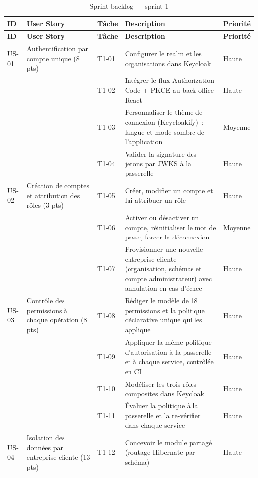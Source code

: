 \begin{small}
\begin{longtable}{L{1.1cm}L{3.0cm}L{1.2cm}L{7.0cm}L{1.4cm}}
\caption{Sprint backlog — sprint 1}\label{tab:backlog-s1}\\
\hline
{}
\textbf{ID} & \textbf{User Story} & \textbf{Tâche} & \textbf{Description} & \textbf{Priorité} \\
\hline
\endfirsthead
\hline
{}
\textbf{ID} & \textbf{User Story} & \textbf{Tâche} & \textbf{Description} & \textbf{Priorité} \\
\hline
\endhead
\hline
\endfoot

US-01 & Authentification par compte unique (8 pts) & T1-01 & Configurer le realm  et les organisations dans Keycloak & Haute \\
\hline
      &  & T1-02 & Intégrer le flux Authorization Code + PKCE au back-office React & Haute \\
\hline
      &  & T1-03 & Personnaliser le thème de connexion (Keycloakify)~: langue et mode sombre de l'application & Moyenne \\
\hline
      &  & T1-04 & Valider la signature des jetons par JWKS à la passerelle & Haute \\
\hline
US-02 & Création de comptes et attribution des rôles (3 pts) & T1-05 & Créer, modifier un compte et lui attribuer un rôle & Haute \\
\hline
      &  & T1-06 & Activer ou désactiver un compte, réinitialiser le mot de passe, forcer la déconnexion & Moyenne \\
\hline
      &  & T1-07 & Provisionner une nouvelle entreprise cliente (organisation, schémas et compte administrateur) avec annulation en cas d'échec & Haute \\
\hline
US-03 & Contrôle des permissions à chaque opération (8 pts) & T1-08 & Rédiger le modèle de 18 permissions et la politique déclarative unique qui les applique & Haute \\
\hline
      &  & T1-09 & Appliquer la même politique d'autorisation à la passerelle et à chaque service, contrôlée en CI & Haute \\
\hline
      &  & T1-10 & Modéliser les trois rôles composites dans Keycloak & Haute \\
\hline
      &  & T1-11 & Évaluer la politique à la passerelle et la re-vérifier dans chaque service & Haute \\
\hline
US-04 & Isolation des données par entreprise cliente (13 pts) & T1-12 & Concevoir le module partagé  (routage Hibernate par schéma) & Haute \\

\end{longtable}
\end{small}
